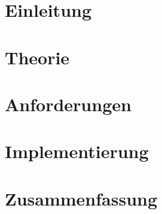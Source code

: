 \section{Einleitung}\label{sec:intro}


\newpage
\section{Theorie}\label{sec:theory}


\newpage
\section{Anforderungen}\label{sec:requirements}


\newpage
\section{Implementierung}\label{sec:implementation}


\newpage
\section{Zusammenfassung}\label{sec:conclusion}

